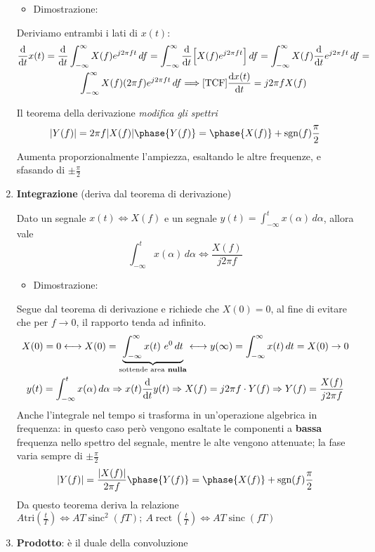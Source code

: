 \documentclass[
  paper=a4,
  ,captions=tableheading
]{scrartcl}
\providecommand{\tightlist}{%
  \setlength{\itemsep}{0pt}\setlength{\parskip}{0pt}}
\begin{document}
\begin{enumerate}
  \begin{itemize}
  \tightlist
  \item
    Dimostrazione:
  \end{itemize}

  Deriviamo entrambi i lati di \(x(t)\): \begin{gather*}
  \dv{}{t}x(t) = \dv{}{t} \int_{-\infty}^{\infty} X(f) e^{j2\pi ft} \,df = \int_{-\infty}^{\infty}\dv{}{t} \Big [X(f) e^{j2\pi ft} \Big ] \,df = \int_{-\infty}^{\infty} X(f) \dv{}{t}e^{j2\pi ft} \,df = 
  \\
  \int_{-\infty}^{\infty} X(f) (2\pi f) e^{j2\pi ft} \,df \Longrightarrow \text{[TCF]}\dv{x(t)}{t} = j2\pi f X(f)
  \end{gather*}

  Il teorema della derivazione \emph{modifica gli spettri} \[
  |Y(f)| = 2\pi f |X(f)| \\ \phase{Y(f)} = \phase{X(f)} + \text{sgn}(f)\frac{\pi}{2}
  \] Aumenta proporzionalmente l'ampiezza, esaltando le altre frequenze,
  e sfasando di \(\pm \frac{\pi}{2}\)
\item
  \textbf{Integrazione} (deriva dal teorema di derivazione)

  Dato un segnale \(x(t) \Longleftrightarrow X(f)\) e un segnale
  \(y(t) = \int_{-\infty}^{t} x(\alpha) \,d\alpha\), allora vale \[
  \int_{-\infty}^{t}  x(\alpha) \,d\alpha \Longleftrightarrow \frac{X(f)}{j2\pi f}
  \]

  \begin{itemize}
  \tightlist
  \item
    Dimostrazione:
  \end{itemize}

  Segue dal teorema di derivazione e richiede che \(X(0)=0\), al fine di
  evitare che per \(f\to 0\), il rapporto tenda ad infinito.
  \begin{gather*}
  X(0)= 0 \longleftrightarrow X(0)=\underbrace{\int_{-\infty}^{\infty}x(t) \ e^{0}\,dt}_{\text{sottende area} \textbf{ nulla}} \longleftrightarrow y(\infty) = \int_{-\infty}^{\infty} x(t)\,dt = X(0) \to 0 \\ y(t) = \int_{-\infty}^{t} x(\alpha) \,d\alpha \Rightarrow x(t) \dv{}{t}y(t) \Rightarrow X(f)=j2\pi f\cdot Y(f) \Rightarrow Y(f) = \frac{X(f)}{j2\pi f}
  \end{gather*} Anche l'integrale nel tempo si trasforma in
  un'operazione algebrica in frequenza: in questo caso però vengono
  esaltate le componenti a \textbf{bassa} frequenza nello spettro del
  segnale, mentre le alte vengono attenuate; la fase varia sempre di
  \(\pm \frac{\pi}{2}\) \[
  |Y(f)| = \frac{|X(f)|}{2\pi f} \\ \phase{Y(f)} = \phase{X(f)} + \text{sgn}(f)\frac{\pi}{2}
  \] Da questo teorema deriva la relazione
  \(A \text{tri}(\frac{t}{T})\Longleftrightarrow AT\mathop{\mathrm{sinc}}^{2}(fT); \ A\mathop{\mathrm{rect}}(\frac{t}{T})\Longleftrightarrow AT\mathop{\mathrm{sinc}}(fT)\)
\item
  \textbf{Prodotto}: è il duale della convoluzione


\end{enumerate}
\end{document}
